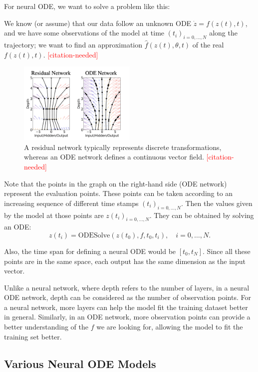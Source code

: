 \documentclass[a4paper,11pt,titlepage]{article}
\newcommand{\citationneeded}{\textcolor{red}{[citation-needed]}}
\theoremstyle{definition}
\theoremstyle{plain}
\theoremstyle{remark}
\begin{document}
For neural ODE, we want to solve a problem like this: 

We know (or assume) that our data follow an unknown ODE $\dot{z}=f(z(t),t)$, and we have some observations of the model at time $(t_i)_{i=0,\dots,N}$ along the trajectory; we want to find an approximation $\hat{f}(z(t),\theta,t)$ of the real $f(z(t),t)$. \citationneeded

\begin{figure}[htbp]
    \centering
    \includegraphics[width=0.5\textwidth]{report/figures/ResNetvsODENet.png}
    \caption{A residual network typically represents discrete transformations, whereas an ODE network defines a continuous vector field. \citationneeded}
    \label{fig:enter-label}
\end{figure}

Note that the points in the graph on the right-hand side (ODE network) represent the evaluation points. These points can be taken according to an increasing sequence of different time stamps $(t_i)_{i=0,\dots,N}$. Then the values given by the model at those points are $z(t_i)_{i=0,\dots,N}$. They can be obtained by solving an ODE:
$$z(t_i)=\mathrm{ODESolve}(z(t_0),f,t_0,t_i),\quad i=0,\dots,N.$$

Also, the time span for defining a neural ODE would be $[t_0,t_N]$. Since all these points are in the same space, each output has the same dimension as the input vector.

Unlike a neural network, where depth refers to the number of layers, in a neural ODE network, depth can be considered as the number of observation points. For a neural network, more layers can help the model fit the training dataset better in general. Similarly, in an ODE network, more observation points can provide a better understanding of the $f$ we are looking for, allowing the model to fit the training set better.

\subsection{Various Neural ODE Models}
\end{document}
